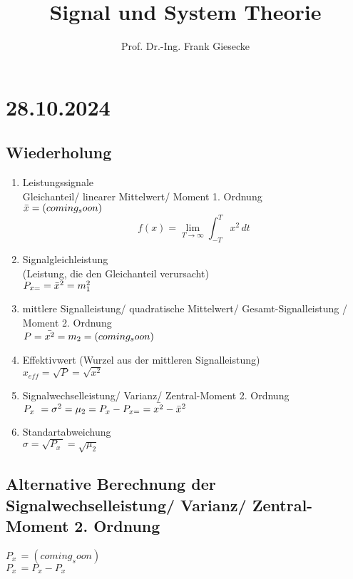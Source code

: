 \documentclass[a4paper]{article}
\title{Signal und System Theorie}
\author{Prof. Dr.-Ing. Frank Giesecke}
\date{}
\begin{document}
\maketitle

\section*{28.10.2024}

\subsection*{Wiederholung}

\begin{enumerate}
\item Leistungssignale \\
Gleichanteil/ linearer Mittelwert/ Moment 1. Ordnung \\
$\Bar{x} = (coming_soon)$
\[
    f(x) = \lim_{T\to\infty} \int_{-T}^{T} x^2 \,dt 
\]

\item Signalgleichleistung \\
(Leistung, die den Gleichanteil verursacht) \\
$P_{x=} = \Bar{x}^2 = m_1^2$

\item mittlere Signalleistung/ quadratische Mittelwert/ Gesamt-Signalleistung / Moment 2. Ordnung \\
$P = \Bar{x^2} = m_2 = (coming_soon)$

\item Effektivwert (Wurzel aus der mittleren Signalleistung) \\
$x_{eff}=\sqrt{P}=\sqrt{x^2}$

\item Signalwechselleistung/ Varianz/ Zentral-Moment 2. Ordnung \\
$P_{x~}=\sigma^2 = \mu_2 = P_x - P_{x=} = \Bar{x^2} - \Bar{x}^2$

\item Standartabweichung \\
$\sigma = \sqrt{P_{x~}} = \sqrt{\mu_2}$
\end{enumerate}

\subsection*{Alternative Berechnung der Signalwechselleistung/ Varianz/ Zentral-Moment 2. Ordnung}
$P_{x~} = (coming_soon)$ \\
$P_{x~} = P_x - P_x$
\end{document}
